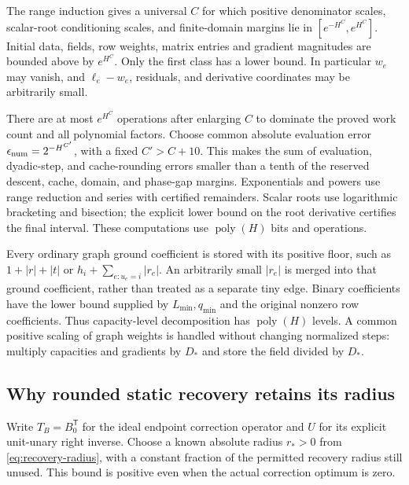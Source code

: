\documentclass[11pt]{article}
\theoremstyle{definition}\newtheorem{definition}[theorem]{Definition}
\theoremstyle{remark}\newtheorem{remark}[theorem]{Remark}
\newcommand{\poly}{\operatorname{poly}}
\begin{document}
The range induction gives a universal $C$ for which positive
denominator scales, scalar-root conditioning scales, and finite-domain
margins lie in $[e^{-H^C},e^{H^C}]$. Initial data, fields, row weights,
matrix entries and gradient magnitudes are bounded above by $e^{H^C}$.
Only the first class has a lower bound. In particular $w_e$ may vanish,
and $\ell_e-w_e$, residuals, and derivative coordinates may be
arbitrarily small.

There are at most $e^{H^C}$ operations after enlarging $C$ to dominate
the proved work count and all polynomial factors. Choose common
absolute evaluation error $\epsilon_{\rm num}=2^{-H^{C'}}$, with a
fixed $C'>C+10$. This makes the sum of evaluation, dyadic-step,
and cache-rounding errors smaller than a tenth of the reserved descent,
cache, domain, and phase-gap margins. Exponentials and powers use range
reduction and series with certified remainders. Scalar roots use
logarithmic bracketing and bisection; the explicit lower bound on the
root derivative certifies the final interval. These computations use
$\poly(H)$ bits and operations.

Every ordinary graph ground coefficient is stored with its positive
floor, such as $1+|r|+|t|$ or $h_i+\sum_{e:u_e=i}|r_e|$.
An arbitrarily small $|r_e|$ is merged into that ground coefficient,
rather than treated as a separate tiny edge. Binary coefficients have
the lower bound supplied by $L_{\min},q_{\min}$ and the original
nonzero row coefficients. Thus capacity-level decomposition has
$\poly(H)$ levels. A common positive scaling of graph weights is
handled without changing normalized steps: multiply capacities and
gradients by $D_*$ and store the field divided by $D_*$.

\subsection{Why rounded static recovery retains its radius}

Write $T_B=B_0^{\mathsf T}$ for the ideal endpoint correction operator
and $U$ for its explicit unit-unary right inverse. Choose a known
absolute radius $r_*>0$ from \eqref{eq:recovery-radius}, with a constant
fraction of the permitted recovery radius still unused. This bound is
positive even when the actual correction optimum is zero.
\end{document}
